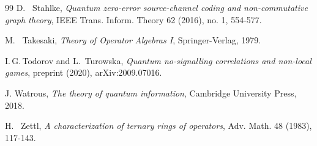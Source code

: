 \documentclass[11pt]{amsart}
\begin{document}
\begin{thebibliography}{99}
{\sc D. \, Stahlke},
{\it Quantum zero-error source-channel coding and non-commutative graph theory},
{\rm IEEE Trans. Inform. Theory 62 (2016), no. 1, 554-577}.

{\sc M. \, Takesaki},
{\it Theory of Operator Algebras I},
{\rm Springer-Verlag, 1979}.

{\sc I.\,G.\,Todorov and L.\, Turowska},
{\it Quantum no-signalling correlations and non-local games},
{\rm preprint (2020), arXiv:2009.07016}.


{\sc J. Watrous},
{\it The theory of quantum information},
{\rm Cambridge University Press, 2018}.

{\sc H. \, Zettl},
{\it A characterization of ternary rings of operators},
{\rm Adv. Math. 48 (1983), 117-143}.




\end{thebibliography}
\end{document}
